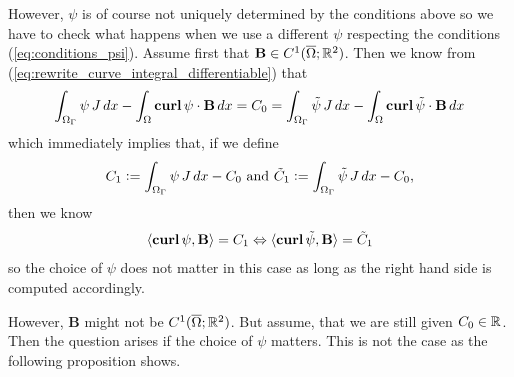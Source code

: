 \documentclass[../master_thesis.tex]{subfiles}
\begin{document}
However, $\psi$ is of course not uniquely determined by the conditions above 
so we have to check what happens when we use a different $\psi$ respecting the 
conditions (\ref{eq:conditions_psi}).
Assume first that $\mathbf{B} \in C^1(\overline{\Omega};\mathbb{R}^2)$. Then we know from 
(\ref{eq:rewrite_curve_integral_differentiable}) that 
\begin{align*}
    \int_{\Omega_\Gamma} \psi \, J \, dx - 
    \int_\Omega \veccurl\psi \cdot \mathbf{B} \, dx 
    = C_0 = \int_{\Omega_\Gamma} \tilde{\psi} \, J \, dx - 
    \int_\Omega \veccurl \tilde{\psi} \cdot \mathbf{B} \, dx
\end{align*}
which immediately implies that, if we define 
\begin{align*}
    C_1 \vcentcolon= \int_{\Omega_\Gamma} \psi \, J \, dx - C_0 \text{ and }
    \tilde{C}_1 \vcentcolon= \int_{\Omega_\Gamma} \tilde{\psi} \, J \, dx - C_0,
\end{align*}
then we know 
\begin{align}
    \langle \veccurl \psi, \mathbf{B} \rangle = C_1 
    \Leftrightarrow \langle \veccurl \tilde{\psi}, \mathbf{B} \rangle = \tilde{C}_1
    \label{eq:equivalence_for_different_psis}
\end{align}
so the choice of $\psi$ does not matter in this case as long as the right hand 
side is computed accordingly.

However, $\mathbf{B}$ might not be $C^1(\overline{\Omega};\mathbb{R}^2)$. 
But assume, that we are still given $C_0 \in \mathbb{R}$. Then the question arises
if the choice of $\psi$ matters. This is not the case as the following proposition shows.
\end{document}
